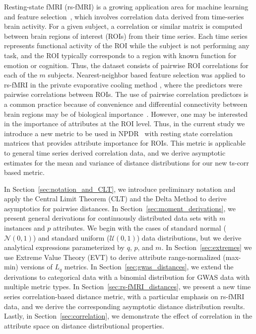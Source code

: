 \documentclass[10pt,letterpaper]{article}
\begin{document}
Resting-state fMRI (rs-fMRI) is a growing application area for machine learning and feature selection~\cite{venkataraman2010,hay2017,sundermann2014,vergun2013}, which involves correlation data derived from time-series brain activity. For a given subject, a correlation or similar matrix is computed between brain regions of interest (ROIs) from their time series. Each time series represents functional activity of the ROI while the subject is not performing any task, and the ROI typically corresponds to a region with known function for emotion or cognition. Thus, the dataset consists of pairwise ROI correlations for each of the $m$ subjects. Nearest-neighbor based feature selection was applied to rs-fMRI in the private evaporative cooling method \cite{le17}, where the predictors were pairwise correlations between ROIs. The use of pairwise correlation predictors is a common practice because of convenience and differential connectivity between brain regions may be of biological importance~\cite{gotts2012}. However, one may be interested in the importance of attributes at the ROI level. Thus, in the current study we introduce a new metric to be used in NPDR~\cite{npdr} with resting state correlation matrices that provides attribute importance for ROIs. This metric is applicable to general time series derived correlation data, and we derive asymptotic estimates for the mean and variance of distance distributions for our new ts-corr based metric.

In Section~\ref{sec:notation_and_CLT}, we introduce preliminary notation and apply the Central Limit Theorem (CLT) and the Delta Method to derive asymptotics for pairwise distances. In Section~\ref{sec:moment_derivations}, we present general derivations for continuously distributed data sets with $m$ instances and $p$ attributes. We begin with the cases of standard normal ($\mathcal{N}(0,1)$) and standard uniform ($\mathcal{U}(0,1)$) data distributions, but we derive analytical expressions parameterized by $q$, $p$, and $m$. In Section~\ref{sec:extremes} we use Extreme Value Theory (EVT) to derive attribute range-normalized (max-min) versions of $L_q$ metrics. In Section~\ref{sec:gwas_distances}, we extend the derivations to categorical data with a binomial distribution for GWAS data with multiple metric types. In Section~\ref{sec:rs-fMRI_distances}, we present a new time series correlation-based distance metric, with a particular emphasis on rs-fMRI data, and we derive the corresponding asymptotic distance distribution results. Lastly, in Section~\ref{sec:correlation}, we demonstrate the effect of correlation in the attribute space on distance distributional properties. 
\end{document}
